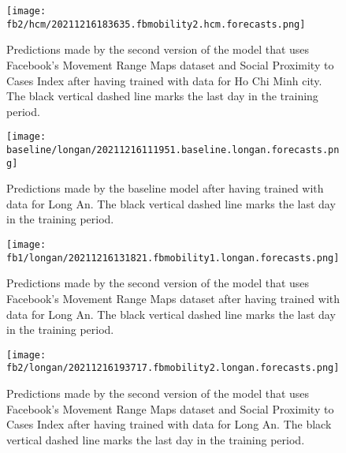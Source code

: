 \begin{figure}[!htb]
    \centering
    \texttt{[image: fb2/hcm/20211216183635.fbmobility2.hcm.forecasts.png]}
    \caption{Predictions made by the second version of the model that uses Facebook's Movement Range Maps dataset and Social Proximity to Cases Index after having trained with data for Ho Chi Minh city. The black vertical dashed line marks the last day in the training period.}
    \label{fig:predictions-hcm-fb2}
\end{figure}


\begin{figure}[!htb]
    \centering
    \texttt{[image: baseline/longan/20211216111951.baseline.longan.forecasts.png]}
    \caption{Predictions made by the baseline model after having trained with data for Long An. The black vertical dashed line marks the last day in the training period.}
    \label{fig:predictions-longan-baseline}
\end{figure}

\begin{figure}[!htb]
    \centering
    \texttt{[image: fb1/longan/20211216131821.fbmobility1.longan.forecasts.png]}
    \caption{Predictions made by the second version of the model that uses Facebook's Movement Range Maps dataset after having trained with data for Long An. The black vertical dashed line marks the last day in the training period.}
    \label{fig:predictions-longan-fb1}
\end{figure}

\begin{figure}[!htb]
    \centering
    \texttt{[image: fb2/longan/20211216193717.fbmobility2.longan.forecasts.png]}
    \caption{Predictions made by the second version of the model that uses Facebook's Movement Range Maps dataset and Social Proximity to Cases Index after having trained with data for Long An. The black vertical dashed line marks the last day in the training period.}
    \label{fig:predictions-longan-fb2}
\end{figure}